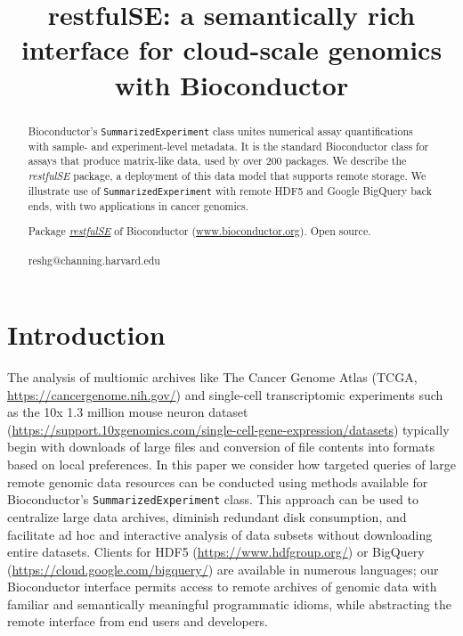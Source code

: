 \documentclass[applications]{gen-bioinformatics}
\author[1]{\pfnm{Shweta}
  \pinit{}
  \psnm{Gopaulakrishnan}}
\author[1]{\pfnm{Samuela}
  \pinit{}
  \psnm{Pollack}}
\author[1]{\pfnm{Benjamin}
  \pinit{}
  \psnm{Stubbs}}
\author[2]{\pfnm{Herv\'e}
  \pinit{}
  \psnm{Pag\`es}}
\author[3]{\pfnm{John}
  \pinit{}
  \psnm{Readey}}
\author[4]{\pfnm{Sean}
  \pinit{}
  \psnm{Davis}}
\author[5]{\pfnm{Levi}
  \pinit{}
  \psnm{Waldron}}
\author[6]{\pfnm{Martin}
  \pinit{T}
  \psnm{Morgan}}
\author[1]{\pfnm{Vincent}
  \pinit{J}
  \psnm{Carey}}
\newcommand{\BiocpackageFirst}[1]{{\emph{\href{https://bioconductor.org/packages/3.8/#1}{#1\textsubscript{\faExternalLink}}}}}
\newcommand{\Biocpackage}[1]{{\textit{#1}}}
\begin{document}
\title{restfulSE: a semantically rich interface for cloud-scale genomics
with Bioconductor}
\maketitle

\begin{abstract}
\begin{subabstract}[Summary]
Bioconductor's \texttt{SummarizedExperiment} class unites numerical
assay quantifications with sample- and experiment-level metadata.  
It is the standard Bioconductor class for assays that
produce matrix-like data, used by over 200 packages.
We describe the \Biocpackage{restfulSE} package, a deployment of 
this data model that supports
remote storage.
We illustrate use of
\texttt{SummarizedExperiment} with remote HDF5 and Google
BigQuery back ends, with two applications in cancer genomics.
\end{subabstract}
\begin{subabstract}[Availability] Package \BiocpackageFirst{restfulSE} of Bioconductor
 (\url {www.bioconductor.org}). Open source.
\end{subabstract}
\begin{subabstract}[Contact]reshg@channing.harvard.edu
\end{subabstract}
\end{abstract}
\section*{Introduction}

The analysis of multiomic archives like The Cancer Genome Atlas (TCGA, \url{https://cancergenome.nih.gov/})
and single-cell transcriptomic experiments such as the 10x 1.3 million
mouse neuron dataset (\url{https://support.10xgenomics.com/single-cell-gene-expression/datasets}) typically begin with downloads of large files and
conversion of file contents into formats based on local preferences.
In this paper we consider how targeted queries of large remote genomic
data resources can be conducted using methods available for
Bioconductor's \texttt{SummarizedExperiment} class.  This approach can
be used to centralize large data archives, diminish redundant disk
consumption, and facilitate ad hoc and interactive analysis of data
subsets without downloading entire datasets. Clients for
HDF5 (\url{https://www.hdfgroup.org/}) or BigQuery (\url{https://cloud.google.com/bigquery/}) are available in numerous languages; our
Bioconductor interface permits access to remote archives of genomic
data with familiar and semantically meaningful programmatic idioms,
while abstracting the remote interface from end users
and developers.
\end{document}
